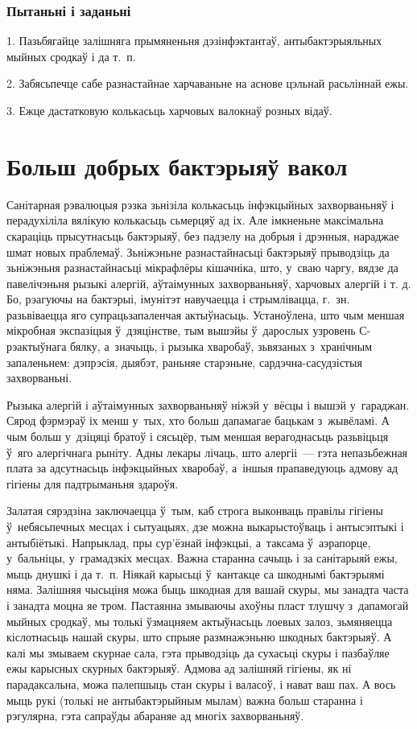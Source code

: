 \subsubsection{Пытаньні і заданьні}

1. Пазьбягайце залішняга прымяненьня дэзінфэктантаў, антыбактэрыяльных мыйных сродкаў і да т.~п.

2. Забясьпечце сабе разнастайнае харчаваньне на аснове цэльнай расьліннай ежы.

3. Ежце дастатковую колькасьць харчовых валокнаў розных відаў.


\section{Больш добрых бактэрыяў вакол}

Санітарная рэвалюцыя рэзка зьнізіла колькасьць інфэкцыйных захворваньняў і перадухіліла вялікую колькасьць сьмерцяў ад іх. Але імкненьне максімальна скараціць прысутнасьць бактэрыяў, без падзелу на добрыя і дрэнныя, нараджае шмат новых праблемаў. Зьніжэньне разнастайнасьці бактэрыяў прыводзіць да зьніжэньня разнастайнасьці мікрафлёры кішачніка, што, у~сваю чаргу, вядзе да павелічэньня рызыкі алергій, аўтаімунных захворваньняў, харчовых алергій і т. д. Бо, рэагуючы на бактэрыі, імунітэт навучаецца і стрымлівацца, г.~зн. разьвіваецца яго супрацьзапаленчая актыўнасьць. Устаноўлена, што чым меншая мікробная экспазіцыя ў~дзяцінстве, тым вышэйы ў~дарослых узровень С-рэактыўнага бялку, а~значыць, і рызыка хваробаў, зьвязаных з~хранічным запаленьнем: дэпрэсія, дыябэт, раньняе старэньне, сардэчна-сасудзістыя захворваньні.

Рызыка алергій і аўтаімунных захворваньняў ніжэй у~вёсцы і вышэй у~гараджан. Сярод фэрмэраў іх менш у~тых, хто больш дапамагае бацькам з~жывёламі. А чым больш у~дзіцяці братоў і сясьцёр, тым меншая верагоднасьць разьвіцьця ў~яго алергічнага рыніту. Адны лекары лічаць, што алергіі~--- гэта непазьбежная плата за адсутнасьць інфэкцыйных хваробаў, а~іншыя прапаведуюць адмову ад гігіены для падтрыманьня здароўя.

Залатая сярэдзіна заключаецца ў~тым, каб строга выконваць правілы гігіены ў~небясьпечных месцах і сытуацыях, дзе можна выкарыстоўваць і антысэптыкі і антыбіётыкі. Напрыклад, пры сур'ёзнай інфэкцыі, а~таксама ў~аэрапорце, у~бальніцы, у~грамадзкіх месцах. Важна старанна сачыць і за санітарыяй ежы, мыць днушкі і да т.~п. Ніякай карысьці ў~кантакце са шкоднымі бактэрыямі няма. Залішняя чысьціня можа быць шкодная для вашай скуры, мы занадта часта і занадта моцна яе тром. Пастаянна змываючы ахоўны пласт тлушчу з~дапамогай мыйных сродкаў, мы толькі ўзмацняем актыўнасьць лоевых залоз, зьмяняецца кіслотнасьць нашай скуры, што спрыяе размнажэньню шкодных бактэрыяў. А калі мы змываем скурнае сала, гэта прыводзіць да сухасьці скуры і пазбаўляе ежы карысных скурных бактэрыяў. Адмова ад залішняй гігіены, як ні парадаксальна, можа палепшыць стан скуры і валасоў, і нават ваш пах. А вось мыць рукі (толькі не антыбактэрыйным мылам) важна больш старанна і рэгулярна, гэта сапраўды абараняе ад многіх захворваньняў.

